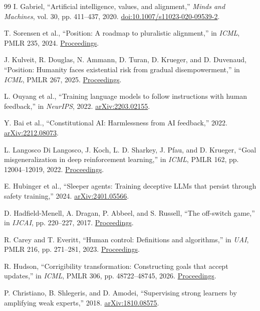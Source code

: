 \documentclass[10pt,twocolumn,letterpaper]{article}
\begin{document}
\begin{thebibliography}{99}
 I. Gabriel, ``Artificial intelligence, values, and alignment,'' \emph{Minds and Machines}, vol. 30, pp. 411--437, 2020. \href{https://doi.org/10.1007/s11023-020-09539-2}{doi:10.1007/s11023-020-09539-2}.

 T. Sorensen et al., ``Position: A roadmap to pluralistic alignment,'' in \emph{ICML}, PMLR 235, 2024. \href{https://proceedings.mlr.press/v235/sorensen24a.html}{Proceedings}.

 J. Kulveit, R. Douglas, N. Ammann, D. Turan, D. Krueger, and D. Duvenaud, ``Position: Humanity faces existential risk from gradual disempowerment,'' in \emph{ICML}, PMLR 267, 2025. \href{https://proceedings.mlr.press/v267/kulveit25a.html}{Proceedings}.

 L. Ouyang et al., ``Training language models to follow instructions with human feedback,'' in \emph{NeurIPS}, 2022. \href{https://arxiv.org/abs/2203.02155}{arXiv:2203.02155}.

 Y. Bai et al., ``Constitutional AI: Harmlessness from AI feedback,'' 2022. \href{https://arxiv.org/abs/2212.08073}{arXiv:2212.08073}.

 L. Langosco Di Langosco, J. Koch, L. D. Sharkey, J. Pfau, and D. Krueger, ``Goal misgeneralization in deep reinforcement learning,'' in \emph{ICML}, PMLR 162, pp. 12004--12019, 2022. \href{https://proceedings.mlr.press/v162/langosco22a.html}{Proceedings}.

 E. Hubinger et al., ``Sleeper agents: Training deceptive LLMs that persist through safety training,'' 2024. \href{https://arxiv.org/abs/2401.05566}{arXiv:2401.05566}.

 D. Hadfield-Menell, A. Dragan, P. Abbeel, and S. Russell, ``The off-switch game,'' in \emph{IJCAI}, pp. 220--227, 2017. \href{https://www.ijcai.org/Proceedings/2017/0032}{Proceedings}.

 R. Carey and T. Everitt, ``Human control: Definitions and algorithms,'' in \emph{UAI}, PMLR 216, pp. 271--281, 2023. \href{https://proceedings.mlr.press/v216/carey23a.html}{Proceedings}.

 R. Hudson, ``Corrigibility transformation: Constructing goals that accept updates,'' in \emph{ICML}, PMLR 306, pp. 48722--48745, 2026. \href{https://proceedings.mlr.press/v306/hudson26a.html}{Proceedings}.

 P. Christiano, B. Shlegeris, and D. Amodei, ``Supervising strong learners by amplifying weak experts,'' 2018. \href{https://arxiv.org/abs/1810.08575}{arXiv:1810.08575}.


\end{thebibliography}
\end{document}
